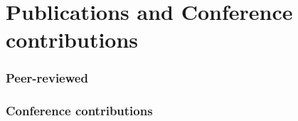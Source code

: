 
\chapter{Publications and Conference contributions} %

\label{chp:pub}
\subsection{Peer-reviewed}

\begin{refsection}
	\begin{refcontext}[sorting=ydnt]
		\nocite{*}
		\printbibliography[heading=none]
	\end{refcontext}
\end{refsection}


\subsection{Conference contributions}

\begin{refsection}
	\begin{refcontext}[sorting=ydnt]
		\nocite{*}
		\printbibliography[heading=none]
	\end{refcontext}
\end{refsection}